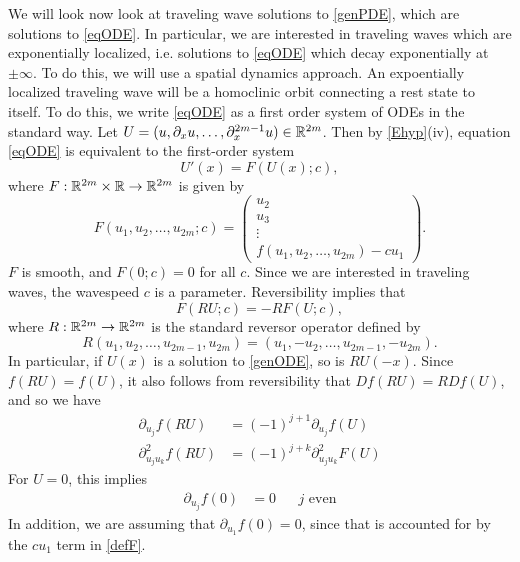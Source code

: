 \documentclass[thesis.tex]{subfiles}
\begin{document}
We will look now look at traveling wave solutions to \cref{genPDE}, which are solutions to \cref{eqODE}. In particular, we are interested in traveling waves which are exponentially localized, i.e. solutions to \cref{eqODE} which decay exponentially at $\pm \infty$. To do this, we will use a spatial dynamics approach. An expoentially localized traveling wave will be a homoclinic orbit connecting a rest state to itself. To do this, we write \cref{eqODE} as a first order system of ODEs in the standard way. Let $U = (u, \partial_x u, \dots, \partial_x^{2m-1} u) \in \mathbb{R}^{2m}$. Then by \cref{Ehyp}(iv), equation \cref{eqODE} is equivalent to the first-order system
\begin{equation}\label{genODE}
U'(x) = F(U(x); c),
\end{equation}
where $F: \mathbb{R}^{2m} \times \mathbb{R} \rightarrow \mathbb{R}^{2m}$ is given by
\begin{equation}\label{defF}
F(u_1, u_2, \dots, u_{2m}; c) = 
\begin{pmatrix}
u_2 \\ u_3 \\ \vdots \\ f(u_1, u_2, \dots, u_{2m}) - c u_1
\end{pmatrix}.
\end{equation}
$F$ is smooth, and $F(0; c) = 0$ for all $c$. Since we are interested in traveling waves, the wavespeed $c$ is a parameter. Reversibility implies that
\begin{equation}\label{genODErev}
F(RU; c) = -RF(U; c),
\end{equation}
where $R:\mathbb{R}^{2m} \rightarrow \mathbb{R}^{2m}$ is the standard reversor operator defined by
\begin{equation}\label{reverserR2m}
R(u_1, u_2, \dots, u_{2m-1}, u_{2m}) = (u_1, -u_2, \dots, u_{2m-1}, -u_{2m}).
\end{equation}
In particular, if $U(x)$ is a solution to \cref{genODE}, so is $RU(-x)$. Since $f(RU) = f(U)$, it also follows from reversibility that $Df(RU) = RDf(U)$, and so we have
\begin{equation}\label{frev}
\begin{aligned}
\partial_{u_j} f(R U) &= (-1)^{j+1} \partial_{u_j} f(U) \\
\partial^2_{u_j u_k} f(R U) &= (-1)^{j+k} \partial^2_{u_j u_k} F(U)
\end{aligned}
\end{equation}
For $U = 0$, this implies
\begin{align}\label{fpartials0}
\partial_{u_j} f(0) &= 0 && j \text{ even}
\end{align}
In addition, we are assuming that $\partial_{u_1} f(0) = 0$, since that is accounted for by the $c u_1$ term in \cref{defF}. 
\end{document}
